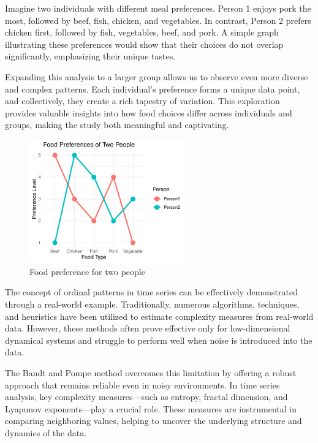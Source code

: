 Imagine two individuals with different meal preferences. Person 1 enjoys pork the most, followed by beef, fish, chicken, and vegetables. In contrast, Person 2 prefers chicken first, followed by fish, vegetables, beef, and pork. A simple graph illustrating these preferences would show that their choices do not overlap significantly, emphasizing their unique tastes.

Expanding this analysis to a larger group allows us to observe even more diverse and complex patterns. Each individual's preference forms a unique data point, and collectively, they create a rich tapestry of variation. This exploration provides valuable insights into how food choices differ across individuals and groups, making the study both meaningful and captivating.

\begin{figure}
	\centering
	\includegraphics[width=0.6\textwidth]{foodpreference}
	\caption{Food preference for two people}
\end{figure}

The concept of ordinal patterns in time series can be effectively demonstrated through a real-world example. Traditionally, numerous algorithms, techniques, and heuristics have been utilized to estimate complexity measures from real-world data. However, these methods often prove effective only for low-dimensional dynamical systems and struggle to perform well when noise is introduced into the data.

The Bandt and Pompe method overcomes this limitation by offering a robust approach that remains reliable even in noisy environments. In time series analysis, key complexity measures—such as entropy, fractal dimension, and Lyapunov exponents—play a crucial role. These measures are instrumental in comparing neighboring values, helping to uncover the underlying structure and dynamics of the data.

